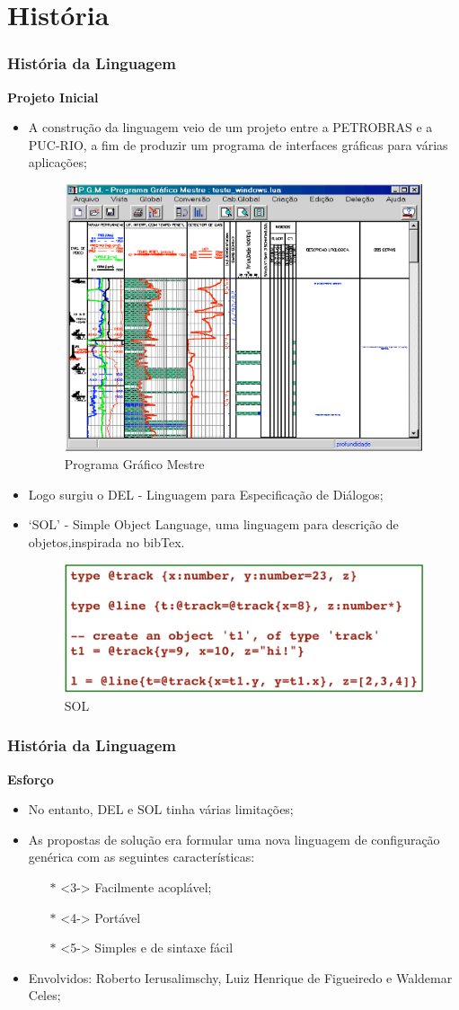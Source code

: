 \documentclass{beamer}
\begin{document}
\section{História}
\begin{frame}[fragile]
\frametitle{História da Linguagem}
	{\bf Projeto Inicial}\vspace{0.2cm}
	\begin{itemize}
		\item <1-> A construção da linguagem veio de um projeto entre a PETROBRAS e a PUC-RIO, a fim de produzir um programa de interfaces gráficas para várias aplicações;
		\begin{figure}[H]
			\centering
			\includegraphics[width=0.2\linewidth]{imagens/imagem1}
			\caption{Programa Gráfico Mestre}
		\end{figure}
		\item <2-> Logo surgiu o DEL - Linguagem para Especificação de Diálogos;
		\item <3-> ‘SOL’ - Simple Object Language, uma linguagem para descrição de objetos,inspirada no bibTex.
		\begin{figure}[H]
			\centering
			\includegraphics[width=0.3\linewidth]{imagens/imagem2}
			\caption{SOL}
		\end{figure}
	\end{itemize}
\end{frame}

\begin{frame}[fragile]
\frametitle{História da Linguagem}
	{\bf Esforço}\vspace{0.2cm}
	\begin{itemize}
		\item<1-> No entanto, DEL e SOL tinha várias limitações;
		\item<2-> As propostas de solução era formular uma nova linguagem de configuração genérica com as seguintes características:
		\begin{itemize}
			\item [$\mathbb{*}$]<3-> Facilmente acoplável;
			\item [$\mathbb{*}$]<4-> Portável
			\item [$\mathbb{*}$]<5-> Simples e de sintaxe fácil
		\end{itemize}
		\item<6-> Envolvidos: Roberto Ierusalimschy, Luiz Henrique de Figueiredo e Waldemar Celes;
	\end{itemize}
\end{frame}
\end{document}
